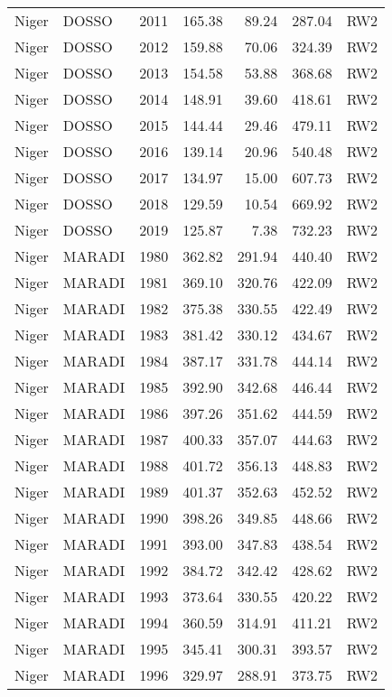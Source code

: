 \begin{longtable}{lllrrrl}
  Niger & DOSSO & 2011 & 165.38 & 89.24 & 287.04 & RW2 \\ 
  Niger & DOSSO & 2012 & 159.88 & 70.06 & 324.39 & RW2 \\ 
  Niger & DOSSO & 2013 & 154.58 & 53.88 & 368.68 & RW2 \\ 
  Niger & DOSSO & 2014 & 148.91 & 39.60 & 418.61 & RW2 \\ 
  Niger & DOSSO & 2015 & 144.44 & 29.46 & 479.11 & RW2 \\ 
  Niger & DOSSO & 2016 & 139.14 & 20.96 & 540.48 & RW2 \\ 
  Niger & DOSSO & 2017 & 134.97 & 15.00 & 607.73 & RW2 \\ 
  Niger & DOSSO & 2018 & 129.59 & 10.54 & 669.92 & RW2 \\ 
  Niger & DOSSO & 2019 & 125.87 & 7.38 & 732.23 & RW2 \\ 
  Niger & MARADI & 1980 & 362.82 & 291.94 & 440.40 & RW2 \\ 
  Niger & MARADI & 1981 & 369.10 & 320.76 & 422.09 & RW2 \\ 
  Niger & MARADI & 1982 & 375.38 & 330.55 & 422.49 & RW2 \\ 
  Niger & MARADI & 1983 & 381.42 & 330.12 & 434.67 & RW2 \\ 
  Niger & MARADI & 1984 & 387.17 & 331.78 & 444.14 & RW2 \\ 
  Niger & MARADI & 1985 & 392.90 & 342.68 & 446.44 & RW2 \\ 
  Niger & MARADI & 1986 & 397.26 & 351.62 & 444.59 & RW2 \\ 
  Niger & MARADI & 1987 & 400.33 & 357.07 & 444.63 & RW2 \\ 
  Niger & MARADI & 1988 & 401.72 & 356.13 & 448.83 & RW2 \\ 
  Niger & MARADI & 1989 & 401.37 & 352.63 & 452.52 & RW2 \\ 
  Niger & MARADI & 1990 & 398.26 & 349.85 & 448.66 & RW2 \\ 
  Niger & MARADI & 1991 & 393.00 & 347.83 & 438.54 & RW2 \\ 
  Niger & MARADI & 1992 & 384.72 & 342.42 & 428.62 & RW2 \\ 
  Niger & MARADI & 1993 & 373.64 & 330.55 & 420.22 & RW2 \\ 
  Niger & MARADI & 1994 & 360.59 & 314.91 & 411.21 & RW2 \\ 
  Niger & MARADI & 1995 & 345.41 & 300.31 & 393.57 & RW2 \\ 
  Niger & MARADI & 1996 & 329.97 & 288.91 & 373.75 & RW2 \\ 

\end{longtable}
